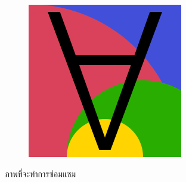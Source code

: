 \begin{figure}[H]
\begin{subfigure}{0.4\linewidth}
        \includegraphics[width=0.8\linewidth]{image/image_inpaint_synthetic/case05-toinpaint.png}		
    \end{subfigure}
    \caption{ภาพที่จะทำการซ่อมแซม}
\end{figure}